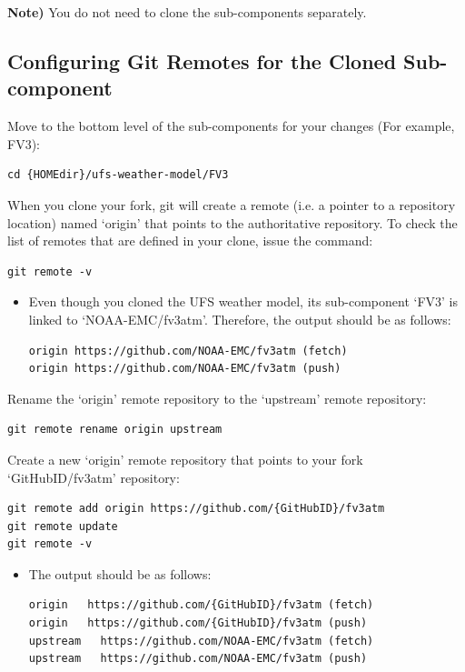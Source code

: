 \documentclass[11pt,fleqn]{report}              %
\begin{document}
\vspace{0.2cm}

{\bf Note)} You do not need to clone the sub-components separately.


\subsection{Configuring Git Remotes for the Cloned Sub-component}
\label{subsec:config_git_remote_subcomp}

Move to the bottom level of the sub-components for your changes (For example, FV3):
\lstset{language=bash}   
\begin{lstlisting}[frame=trBL]
cd {HOMEdir}/ufs-weather-model/FV3
\end{lstlisting}

When you clone your fork, git will create a remote (i.e. a pointer to a repository location) named `origin' that points to the authoritative repository. To check the list of remotes that are defined in your clone, issue the command:
\lstset{language=bash}   
\begin{lstlisting}[frame=trBL]
git remote -v
\end{lstlisting}

\begin{itemize}
\item Even though you cloned the UFS weather model, its sub-component `FV3' is linked to `NOAA-EMC/fv3atm'. Therefore, the output should be as follows:
\lstset{language=bash}   
\begin{lstlisting}[frame=trBL]
origin https://github.com/NOAA-EMC/fv3atm (fetch)
origin https://github.com/NOAA-EMC/fv3atm (push)
\end{lstlisting}
\end{itemize}

Rename the `origin' remote repository to the `upstream' remote repository:
\lstset{language=bash}   
\begin{lstlisting}[frame=trBL]
git remote rename origin upstream
\end{lstlisting}

Create a new `origin' remote repository that points to your fork `{GitHubID}/fv3atm' repository:
\lstset{language=bash}   
\begin{lstlisting}[frame=trBL]
git remote add origin https://github.com/{GitHubID}/fv3atm
git remote update
git remote -v
\end{lstlisting}

\begin{itemize}
\item The output should be as follows:
\lstset{language=bash}   
\begin{lstlisting}[frame=trBL]
origin   https://github.com/{GitHubID}/fv3atm (fetch)
origin   https://github.com/{GitHubID}/fv3atm (push)
upstream   https://github.com/NOAA-EMC/fv3atm (fetch)
upstream   https://github.com/NOAA-EMC/fv3atm (push)
\end{lstlisting}
\end{itemize}
\end{document}
